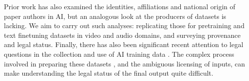 Prior work has also examined the identities, affiliations and national origin of paper authors \citep{movva2024topics} in AI, but an analogous look at the producers of datasets is lacking. We aim to carry out such analyses: replicating those for pretraining and text finetuning datasets in video and audio domains, and surveying provenance and legal status. Finally, there has also been significant recent attention to legal questions in the collection and use of AI training data \citep{Sag2020TheNL, henderson2023foundation}. The complex process involved in preparing these datasets \citep{lee2023talkin}, and the ambiguous licensing of inputs, can make understanding the legal status of the final output quite difficult.